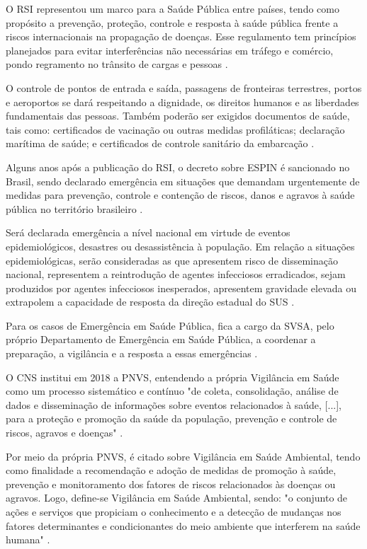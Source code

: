 \indent O \acrfull{RSI} representou um marco para a Saúde Pública entre países, tendo como propósito a prevenção, proteção, controle e resposta à saúde pública frente a riscos internacionais na propagação de doenças. Esse regulamento tem princípios planejados para evitar interferências não necessárias em tráfego e comércio, pondo regramento no trânsito de cargas e pessoas \cite{Brasil2005RegulamentoSI}.

\indent O controle de pontos de entrada e saída, passagens de fronteiras terrestres, portos e aeroportos se dará respeitando a dignidade, os direitos humanos e as liberdades fundamentais das pessoas. Também poderão ser exigidos documentos de saúde, tais como: certificados de vacinação ou outras medidas profiláticas; declaração marítima de saúde; e certificados de controle sanitário da embarcação \cite{Brasil2005RegulamentoSI}.

\indent Alguns anos após a publicação do \acrshort{RSI}, o decreto sobre \acrfull{ESPIN} é sancionado no Brasil, sendo declarado emergência em situações que demandam urgentemente de medidas para prevenção, controle e contenção de riscos, danos e agravos à saúde pública no território brasileiro \cite{Brasil2011ESPIN}.

\indent Será declarada emergência a nível nacional em virtude de eventos epidemiológicos, desastres ou desassistência à população. Em relação a situações epidemiológicas, serão consideradas as que apresentem risco de disseminação nacional, representem a reintrodução de agentes infecciosos erradicados, sejam produzidos por agentes infecciosos inesperados, apresentem gravidade elevada ou extrapolem a capacidade de resposta da direção estadual do \acrfull{SUS} \cite{Brasil2011ESPIN}.

\indent Para os casos de Emergência em Saúde Pública, fica a cargo da \acrfull{SVSA}, pelo próprio Departamento de Emergência em Saúde Pública, a coordenar a preparação, a vigilância e a resposta a essas emergências \cite{SVSA2023_2}.

\indent O \acrfull{CNS} institui em 2018 a \acrfull{PNVS}, entendendo a própria Vigilância em Saúde como um processo sistemático e contínuo "de coleta, consolidação, análise de dados e disseminação de informações sobre eventos
relacionados à saúde, [...], para a proteção e promoção da saúde da população, prevenção e controle de riscos, agravos e doenças" \cite{Brasil2018PNVS}.

\indent Por meio da própria \acrshort{PNVS}, é citado sobre Vigilância em Saúde Ambiental, tendo como finalidade a recomendação e adoção de medidas de promoção à saúde, prevenção e monitoramento dos fatores de riscos relacionados às doenças ou agravos. Logo, define-se Vigilância em Saúde Ambiental, sendo: "o conjunto de ações e serviços que propiciam o conhecimento e a detecção de mudanças nos fatores determinantes e condicionantes do meio ambiente que interferem na saúde humana" \cite{Brasil2018PNVS}.


